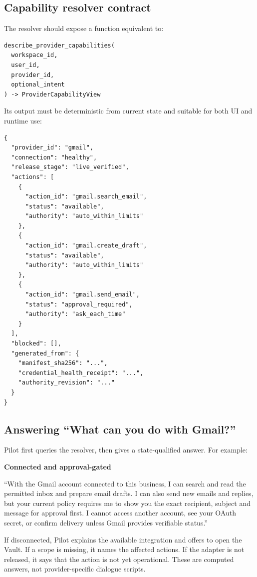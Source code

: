 \documentclass[11pt,a4paper]{article}
\begin{document}
\subsection{Capability resolver contract}

The resolver should expose a function equivalent to:

\begin{lstlisting}
describe_provider_capabilities(
  workspace_id,
  user_id,
  provider_id,
  optional_intent
) -> ProviderCapabilityView
\end{lstlisting}

Its output must be deterministic from current state and suitable for both UI
and runtime use:

\begin{lstlisting}
{
  "provider_id": "gmail",
  "connection": "healthy",
  "release_stage": "live_verified",
  "actions": [
    {
      "action_id": "gmail.search_email",
      "status": "available",
      "authority": "auto_within_limits"
    },
    {
      "action_id": "gmail.create_draft",
      "status": "available",
      "authority": "auto_within_limits"
    },
    {
      "action_id": "gmail.send_email",
      "status": "approval_required",
      "authority": "ask_each_time"
    }
  ],
  "blocked": [],
  "generated_from": {
    "manifest_sha256": "...",
    "credential_health_receipt": "...",
    "authority_revision": "..."
  }
}
\end{lstlisting}

\subsection{Answering ``What can you do with Gmail?''}

Pilot first queries the resolver, then gives a state-qualified answer. For
example:

\begin{tcolorbox}[colback=AionPale,colframe=AionRule]
\textbf{Connected and approval-gated}\par
``With the Gmail account connected to this business, I can search and read the
permitted inbox and prepare email drafts. I can also send new emails and replies,
but your current policy requires me to show you the exact recipient, subject and
message for approval first. I cannot access another account, see your OAuth
secret, or confirm delivery unless Gmail provides verifiable status.''
\end{tcolorbox}

If disconnected, Pilot explains the available integration and offers to open
the Vault. If a scope is missing, it names the affected actions. If the adapter
is not released, it says that the action is not yet operational. These are
computed answers, not provider-specific dialogue scripts.
\end{document}
